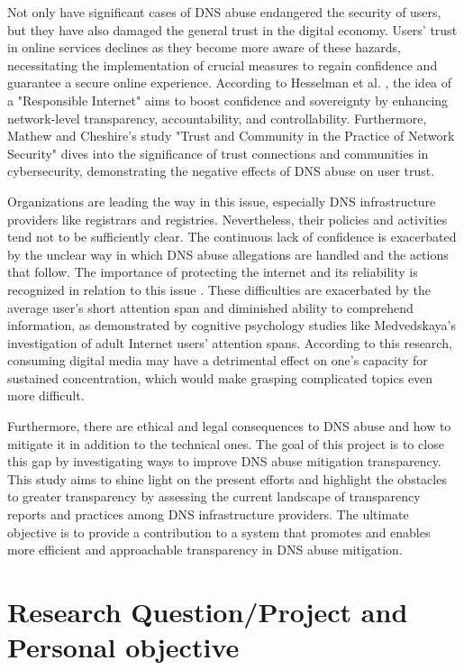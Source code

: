 Not only have significant cases of DNS abuse endangered the security of users, but they have also damaged the general trust in the digital economy. Users' trust in online services declines as they become more aware of these hazards, necessitating the implementation of crucial measures to regain confidence and guarantee a secure online experience. According to Hesselman et al. \cite{hesselman2020}, the idea of a "Responsible Internet" aims to boost confidence and sovereignty by enhancing network-level transparency, accountability, and controllability. Furthermore, Mathew and Cheshire's \cite{mathew2016} study "Trust and Community in the Practice of Network Security" dives into the significance of trust connections and communities in cybersecurity, demonstrating the negative effects of DNS abuse on user trust.

Organizations are leading the way in this issue, especially DNS infrastructure providers like registrars and registries. Nevertheless, their policies and activities tend not to be sufficiently clear. The continuous lack of confidence is exacerbated by the unclear way in which DNS abuse allegations are handled and the actions that follow. The importance of protecting the internet and its reliability is recognized in relation to this issue \cite{cerf2022}. These difficulties are exacerbated by the average user's short attention span and diminished ability to comprehend information, as demonstrated by cognitive psychology studies like Medvedskaya's \cite{medvedskaya2022} investigation of adult Internet users' attention spans. According to this research, consuming digital media may have a detrimental effect on one's capacity for sustained concentration, which would make grasping complicated topics even more difficult.

Furthermore, there are ethical and legal consequences to DNS abuse and how to mitigate it in addition to the technical ones. The goal of this project is to close this gap by investigating ways to improve DNS abuse mitigation transparency. This study aims to shine light on the present efforts and highlight the obstacles to greater transparency by assessing the current landscape of transparency reports and practices among DNS infrastructure providers. The ultimate objective is to provide a contribution to a system that promotes and enables more efficient and approachable transparency in DNS abuse mitigation.




\section{Research Question/Project and Personal objective} 
